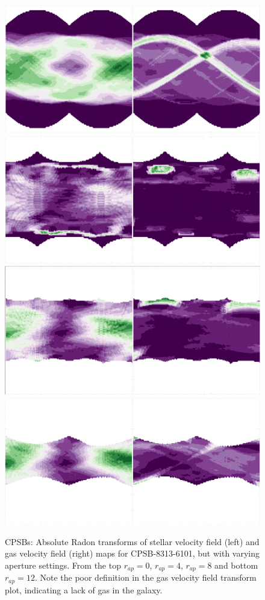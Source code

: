 \begin{figure}
    \centering
    \includegraphics[width=0.6\columnwidth]{images/RadonPlots/RT-snips/CPSB-8313-6101-SG-AP-00.png}
    \includegraphics[width=0.6\columnwidth]{images/RadonPlots/RT-snips/CPSB-8313-6101-SG-AP-04.png}
    \includegraphics[width=0.6\columnwidth]{images/RadonPlots/RT-snips/CPSB-8313-6101-SG-AP-08.png}
    \includegraphics[width=0.6\columnwidth]{images/RadonPlots/RT-snips/CPSB-8313-6101-SG-AP-12.png}
    \caption{CPSBs: Absolute Radon transforms of stellar velocity field (left) and gas velocity field (right) maps for CPSB-8313-6101, but with varying aperture settings. From the top $r_{ap}=0$, $r_{ap}=4$, $r_{ap}=8$ and bottom $r_{ap}=12$. Note the poor definition in the gas velocity field transform plot, indicating a lack of gas in the galaxy.}
    \label{fig:CPSB-RT-Apertures}
\end{figure}

